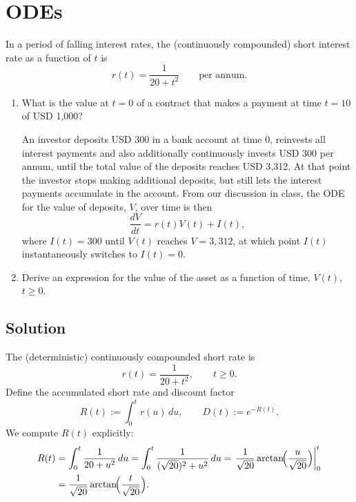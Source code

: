 \documentclass{article}
\begin{document}
\newpage

\section{ODEs}

In a period of falling interest rates, the (continuously compounded) short interest rate as a function of $t$ is
\[
r(t)=\frac{1}{20+t^2}
\qquad \text{per annum.}
\]

\begin{enumerate}
\item[(a)] What is the value at $t=0$ of a contract that makes a payment at time $t=10$ of USD 1{,}000?

\medskip
An investor deposits USD 300 in a bank account at time 0, reinvests all interest payments and also additionally continuously invests USD 300 per annum, until the total value of the deposits reaches USD 3{,}312. At that point the investor stops making additional deposits, but still lets the interest payments accumulate in the account. From our discussion in class, the ODE for the value of deposits, $V$, over time is then
\[
\frac{dV}{dt}=r(t)V(t)+I(t),
\]
where $I(t)=300$ until $V(t)$ reaches $V=3{,}312$, at which point $I(t)$ instantaneously switches to $I(t)=0$.

\item[(b)] Derive an expression for the value of the asset as a function of time, $V(t)$, $t\ge 0$.
\end{enumerate}

\subsection*{Solution}


The (deterministic) continuously compounded short rate is
\[
r(t)=\frac{1}{20+t^2},\qquad t\ge 0.
\]
Define the accumulated short rate and discount factor
\[
R(t):=\int_0^t r(u)\,du,
\qquad
D(t):=e^{-R(t)}.
\]
We compute $R(t)$ explicitly:
\begin{align*}
R(t)
&=\int_0^t \frac{1}{20+u^2}\,du
=\int_0^t \frac{1}{(\sqrt{20})^2+u^2}\,du
=\left.\frac{1}{\sqrt{20}}\arctan\!\Bigl(\frac{u}{\sqrt{20}}\Bigr)\right|_0^t \\
&=\frac{1}{\sqrt{20}}\arctan\!\Bigl(\frac{t}{\sqrt{20}}\Bigr).
\end{align*}
\end{document}

